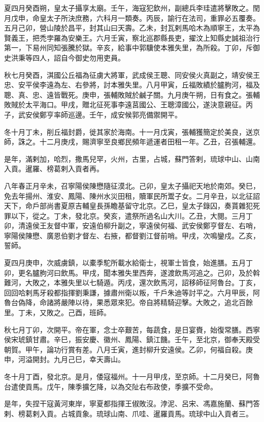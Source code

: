 \begin{pinyinscope}
夏四月癸酉朔，皇太子攝享太廟。壬午，海寇犯欽州，副總兵李珪遣將擊敗之。閏月戊申，命皇太子所決庶務，六科月一類奏。丙辰，諭行在法司，重罪必五覆奏。五月己卯，營山陵於昌平，封其山曰天壽。乙未，封瓦剌馬哈木為順寧王，太平為賢義王，把禿孛羅為安樂王。六月壬寅，察北巡郡縣長吏，擢汶上知縣史誠祖治行第一，下易州同知張騰於獄。辛亥，給事中郭驥使本雅失里，為所殺。丁卯，斥御史洪秉等四人，詔自今御史勿用吏員。

秋七月癸酉，淇國公丘福為征虜大將軍，武成侯王聰、同安侯火真副之，靖安侯王忠、安平侯李遠為左、右參將，討本雅失里。八月甲寅，丘福敗績於臚朐河，福及聰、真、忠、遠皆戰死。庚申，張輔敗賊於鹹子關。九月庚午朔，日有食之。張輔敗賊於太平海口。甲戌，贈北征死事李遠莒國公、王聰漳國公，遂決意親征。丙子，武安侯鄭亨率師巡邊。壬午，成安候郭亮備禦開平。

冬十月丁未，削丘福封爵，徙其家於海南。十一月戊寅，張輔獲簡定於美良，送京師，誅之。十二月庚戌，賜濟寧至良鄉民頻年遞運者田租一年。乙丑，召張輔還。

是年，滿剌加，哈烈，撒馬兒罕，火州，古里，占城，蘇門答剌，琉球中山、山南入貢。暹羅、榜葛剌入貢者再。

八年春正月辛未，召寧陽侯陳懋隨征漠北。己卯，皇太子攝祀天地於南郊。癸巳，免去年揚州、淮安、鳳陽、陳州水災田租，贖軍民所鬻子女。二月辛丑，以北征詔天下，命戶部尚書夏原吉輔皇長孫瞻基留守北京。乙巳，皇太子錄囚，奏貰雜犯死罪以下，從之。丁未，發北京。癸亥，遣祭所過名山大川。乙丑，大閱。三月丁卯，清遠侯王友督中軍，安遠伯柳升副之，寧遠侯何福、武安侯鄭亨督左、右哨，寧陽侯陳懋、廣恩伯劉才督左、右掖，都督劉江督前哨。甲戌，次鳴鑾戍。乙亥，誓師。

夏四月庚申，次威虜鎮，以橐季駝所載水給衛士，視軍士皆食，始進膳。五月丁卯，更名臚朐河曰飲馬。甲戌，聞本雅失里西奔，遂渡飲馬河追之。己卯，及於斡難河，大敗之，本雅失里以七騎遁。丙戌，還次飲馬河，詔移師征阿魯台。丁亥，回回哈剌馬牙殺都指揮劉秉謙，據肅州衛以叛，千戶朱迪等討平之。六月甲辰，阿魯台偽降，命諸將嚴陣以待，果悉眾來犯。帝自將精騎迎擊。大敗之，追北百餘里。丁未，又敗之。己酉，班師。

秋七月丁卯，次開平。帝在軍，念士卒艱苦，每蔬食，是日宴賚，始復常膳。西寧侯宋琥鎮甘肅。辛巳，振安慶、徽州、鳳陽、鎮江饑。壬午，至北京，御奉天殿受朝賀。甲午，論功行賞有差。八月壬寅，進封柳升安遠侯。乙卯，何福自殺。庚申，河溢開封。九月己巳，幸天壽山。

冬十月丁酉，發北京。是月，倭寇福州。十一月甲戌，至京師。十二月癸巳，阿魯台遣使貢馬。戊午，陳季擴乞降，以為交阯右布政使，季擴不受命。

是年，失捏干寇黃河東岸，寧夏都指揮王俶敗沒。浡泥、呂宋、馮嘉施蘭、蘇門答剌、榜葛剌入貢。占城貢象。琉球山南、爪哇、暹羅貢馬。琉球中山入貢者三。


\end{pinyinscope}
